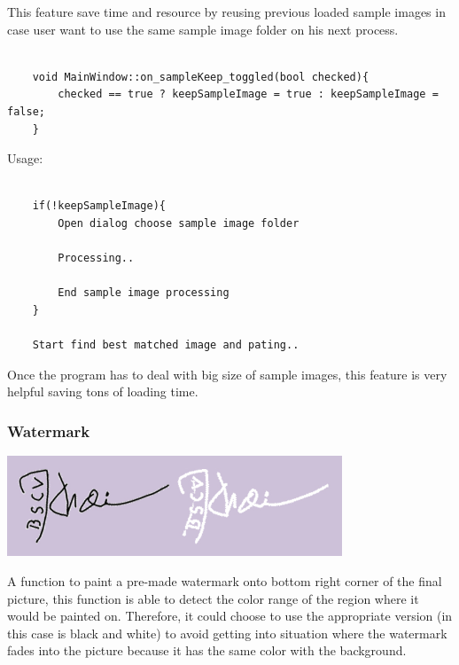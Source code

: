\documentclass[english]{article}
\begin{document}
{This feature save time and resource by reusing previous loaded sample images in case user want to use the same sample image folder on his next process.

\lstset{language=C++}
\begin{lstlisting}

	void MainWindow::on_sampleKeep_toggled(bool checked){
		checked == true ? keepSampleImage = true : keepSampleImage = false;
	}

\end{lstlisting}

Usage:

\lstset{language=C++}
\begin{lstlisting}

	if(!keepSampleImage){
		Open dialog choose sample image folder
		
		Processing..
		
		End sample image processing
	}
	
	Start find best matched image and pating..
\end{lstlisting}

Once the program has to deal with big size of sample images, this feature is very helpful saving tons of loading time.

\subsubsection{Watermark}

\begin{center}
	\includegraphics[width=10cm,height=3cm]{img/watermark.jpg}	
\end{center} 

A function to paint a pre-made watermark onto bottom right corner of the final picture, this function is able to detect the color range of the region where it would be painted on. Therefore, it could choose to use the appropriate version (in this case is black and white) to avoid getting into situation where the watermark fades into the picture because it has the same color with the background.

\lstset{language=C++}
\begin{lstlisting}


\end{lstlisting}}
\end{document}

